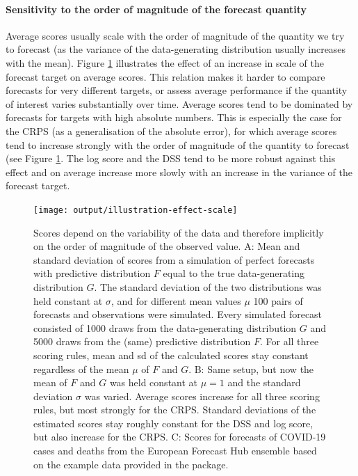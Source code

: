 \documentclass[
]{jss}
\begin{document}
\hypertarget{sensitivity-to-the-order-of-magnitude-of-the-forecast-quantity}{%
\paragraph{Sensitivity to the order of magnitude of the forecast
quantity}\label{sensitivity-to-the-order-of-magnitude-of-the-forecast-quantity}}

Average scores usually scale with the order of magnitude of the quantity
we try to forecast (as the variance of the data-generating distribution
usually increases with the mean). Figure \ref{fig:score-scale}
illustrates the effect of an increase in scale of the forecast target on
average scores. This relation makes it harder to compare forecasts for
very different targets, or assess average performance if the quantity of
interest varies substantially over time. Average scores tend to be
dominated by forecasts for targets with high absolute numbers. This is
especially the case for the CRPS (as a generalisation of the absolute
error), for which average scores tend to increase strongly with the
order of magnitude of the quantity to forecast (see Figure
\ref{fig:score-scale}. The log score and the DSS tend to be more robust
against this effect and on average increase more slowly with an increase
in the variance of the forecast target.

\begin{CodeChunk}
\begin{figure}

{\centering \texttt{[image: output/illustration-effect-scale]}

}

\caption[Scores depend on the variability of the data and therefore implicitly on the order of magnitude of the observed value]{Scores depend on the variability of the data and therefore implicitly on the order of magnitude of the observed value. A: Mean and standard deviation of scores from a simulation of perfect forecasts with predictive distribution $F$ equal to the true data-generating distribution $G$. The standard deviation of the two distributions was held constant at $\sigma$, and for different mean values $\mu$ 100 pairs of forecasts and observations were simulated. Every simulated forecast consisted of 1000 draws from the data-generating distribution $G$ and 5000 draws from the (same) predictive distribution $F$. For all three scoring rules, mean and sd of the calculated scores stay constant regardless of the mean $\mu$ of $F$ and $G$. B: Same setup, but now the mean of $F$ and $G$ was held constant at $\mu = 1$ and the standard deviation $\sigma$ was varied. Average scores increase for all three scoring rules, but most strongly for the CRPS. Standard deviations of the estimated scores stay roughly constant for the DSS and log score, but also increase for the CRPS. C: Scores for forecasts of COVID-19 cases and deaths from the European Forecast Hub ensemble based on the example data provided in the package.}\label{fig:score-scale}
\end{figure}
\end{CodeChunk}
\end{document}
